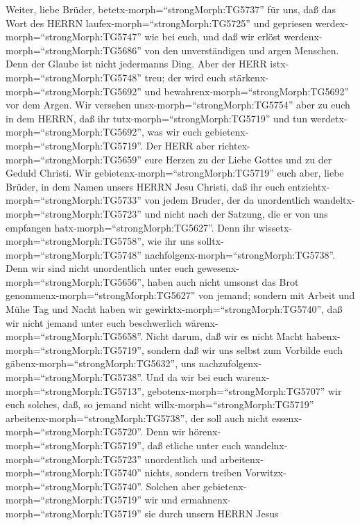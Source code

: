  Weiter, liebe Brüder, betetx-morph=``strongMorph:TG5737''
für uns, daß das Wort des HERRN laufex-morph=``strongMorph:TG5725'' und
gepriesen werdex-morph=``strongMorph:TG5747'' wie bei euch, 
und daß wir erlöst werdenx-morph=``strongMorph:TG5686'' von den
unverständigen und argen Menschen. Denn der Glaube ist nicht jedermanns
Ding.  Aber der HERR istx-morph=``strongMorph:TG5748'' treu;
der wird euch stärkenx-morph=``strongMorph:TG5692'' und
bewahrenx-morph=``strongMorph:TG5692'' vor dem Argen.  Wir
versehen unsx-morph=``strongMorph:TG5754'' aber zu euch in dem HERRN,
daß ihr tutx-morph=``strongMorph:TG5719'' und tun
werdetx-morph=``strongMorph:TG5692'', was wir euch
gebietenx-morph=``strongMorph:TG5719''.  Der HERR aber
richtex-morph=``strongMorph:TG5659'' eure Herzen zu der Liebe Gottes und
zu der Geduld Christi.  Wir
gebietenx-morph=``strongMorph:TG5719'' euch aber, liebe Brüder, in dem
Namen unsers HERRN Jesu Christi, daß ihr euch
entziehtx-morph=``strongMorph:TG5733'' von jedem Bruder, der da
unordentlich wandeltx-morph=``strongMorph:TG5723'' und nicht nach der
Satzung, die er von uns empfangen hatx-morph=``strongMorph:TG5627''.
 Denn ihr wissetx-morph=``strongMorph:TG5758'', wie ihr uns
solltx-morph=``strongMorph:TG5748''
nachfolgenx-morph=``strongMorph:TG5738''. Denn wir sind nicht
unordentlich unter euch gewesenx-morph=``strongMorph:TG5656'',
 haben auch nicht umsonst das Brot
genommenx-morph=``strongMorph:TG5627'' von jemand; sondern mit Arbeit
und Mühe Tag und Nacht haben wir gewirktx-morph=``strongMorph:TG5740'',
daß wir nicht jemand unter euch beschwerlich
wärenx-morph=``strongMorph:TG5658''.  Nicht darum, daß wir
es nicht Macht habenx-morph=``strongMorph:TG5719'', sondern daß wir uns
selbst zum Vorbilde euch gäbenx-morph=``strongMorph:TG5632'', uns
nachzufolgenx-morph=``strongMorph:TG5738''.  Und da wir bei
euch warenx-morph=``strongMorph:TG5713'',
gebotenx-morph=``strongMorph:TG5707'' wir euch solches, daß, so jemand
nicht willx-morph=``strongMorph:TG5719''
arbeitenx-morph=``strongMorph:TG5738'', der soll auch nicht
essenx-morph=``strongMorph:TG5720''.  Denn wir
hörenx-morph=``strongMorph:TG5719'', daß etliche unter euch
wandelnx-morph=``strongMorph:TG5723'' unordentlich und
arbeitenx-morph=``strongMorph:TG5740'' nichts, sondern treiben
Vorwitzx-morph=``strongMorph:TG5740''.  Solchen aber
gebietenx-morph=``strongMorph:TG5719'' wir und
ermahnenx-morph=``strongMorph:TG5719'' sie durch unsern HERRN Jesus
